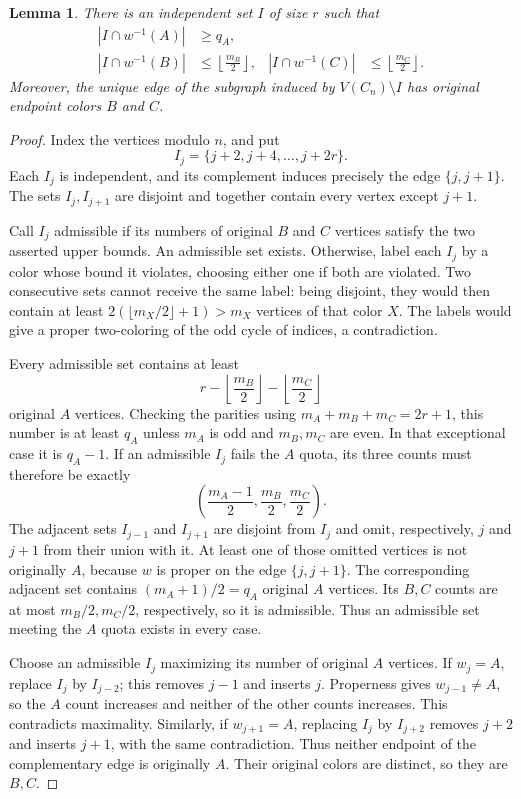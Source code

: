 \documentclass[10pt,a4paper]{amsart}
\numberwithin{equation}{section}
\newtheorem{lemma}[theorem]{Lemma}
\theoremstyle{definition}
\theoremstyle{remark}
\begin{document}
\begin{lemma}\label{odd:fair}
There is an independent set $I$ of size $r$ such that
\begin{align*}
|I\cap w^{-1}(A)|&\ge q_A,\\
|I\cap w^{-1}(B)|&\le\left\lfloor\frac{m_B}{2}\right\rfloor,
&
|I\cap w^{-1}(C)|&\le\left\lfloor\frac{m_C}{2}\right\rfloor.
\end{align*}
Moreover, the unique edge of the subgraph induced by $V(C_n)\setminus I$
has original endpoint colors $B$ and $C$.
\end{lemma}
\begin{proof}
Index the vertices modulo $n$, and put
\[
I_j=\{j+2,j+4,\ldots,j+2r\}.
\]
Each $I_j$ is independent, and its complement induces precisely the
edge $\{j,j+1\}$. The sets $I_j,I_{j+1}$ are disjoint and together
contain every vertex except $j+1$.

Call $I_j$ admissible if its numbers of original $B$ and $C$ vertices
satisfy the two asserted upper bounds. An admissible set exists.
Otherwise, label each $I_j$ by a color whose bound it violates,
choosing either one if both are violated. Two consecutive sets cannot
receive the same label: being disjoint, they would then contain at
least $2(\lfloor m_X/2\rfloor+1)>m_X$ vertices of that color $X$.
The labels would give a proper two-coloring of the odd cycle of
indices, a contradiction.

Every admissible set contains at least
\[
r-\left\lfloor\frac{m_B}{2}\right\rfloor
 -\left\lfloor\frac{m_C}{2}\right\rfloor
\]
original $A$ vertices. Checking the parities using
$m_A+m_B+m_C=2r+1$, this number is at least $q_A$ unless
$m_A$ is odd and $m_B,m_C$ are even. In that exceptional case it is
$q_A-1$. If an admissible $I_j$ fails the $A$ quota, its three counts
must therefore be exactly
\[
\left(\frac{m_A-1}{2},\frac{m_B}{2},\frac{m_C}{2}\right).
\]
The adjacent sets $I_{j-1}$ and $I_{j+1}$ are disjoint from $I_j$
and omit, respectively, $j$ and $j+1$ from their union with it.
At least one of those omitted vertices is not originally $A$, because
$w$ is proper on the edge $\{j,j+1\}$. The corresponding adjacent
set contains $(m_A+1)/2=q_A$ original $A$ vertices. Its $B,C$
counts are at most $m_B/2,m_C/2$, respectively, so it is admissible.
Thus an admissible set meeting the $A$ quota exists in every case.

Choose an admissible $I_j$ maximizing its number of original $A$
vertices. If $w_j=A$, replace $I_j$ by $I_{j-2}$; this removes
$j-1$ and inserts $j$. Properness gives $w_{j-1}\ne A$, so the
$A$ count increases and neither of the other counts increases.
This contradicts maximality. Similarly, if $w_{j+1}=A$, replacing
$I_j$ by $I_{j+2}$ removes $j+2$ and inserts $j+1$, with the same
contradiction. Thus neither endpoint of the complementary edge is
originally $A$. Their original colors are distinct, so they are $B,C$.
\end{proof}
\end{document}
